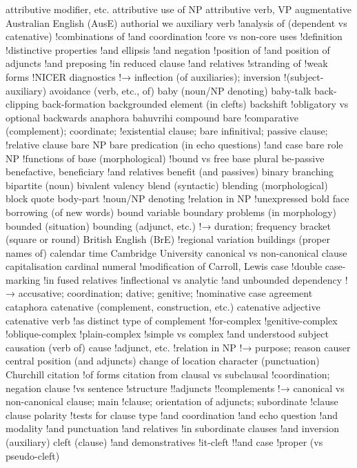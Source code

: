 attributive modifier, etc.
attributive use of NP
attributive verb, VP
augmentative
Australian English (AusE)
authorial we
auxiliary verb
!analysis of (dependent vs catenative)
!combinations of
!and coordination
!core vs non-core uses
!definition
!distinctive properties
!and ellipsis
!and negation
!position of
!and position of adjuncts
!and preposing
!in reduced clause
!and relatives
!stranding of
!weak forms
!NICER diagnostics
!→ inflection (of auxiliaries); inversion
!(subject-auxiliary)
avoidance (verb, etc., of)
baby (noun/NP denoting)
baby-talk
back-clipping
back-formation
backgrounded element (in clefts)
backshift
!obligatory vs optional
backwards anaphora
bahuvrihi compound
bare
!comparative (complement); coordinate;
!existential clause; bare infinitival; passive clause;
!relative clause
bare NP
bare predication (in echo questions)
!and case
bare role NP
!functions of
base (morphological)
!bound vs free
base plural
be-passive
benefactive, beneficiary
!and relatives
benefit (and passives)
binary branching
bipartite (noun)
bivalent valency
blend (syntactic)
blending (morphological)
block quote
body-part
!noun/NP denoting
!relation in NP
!unexpressed
bold face
borrowing (of new words)
bound variable
boundary problems (in morphology)
bounded (situation)
bounding (adjunct, etc.)
!→ duration; frequency
bracket (square or round)
British English (BrE)
!regional variation
buildings (proper names of)
calendar time
Cambridge University
canonical vs non-canonical clause
capitalisation
cardinal numeral
!modification of
Carroll, Lewis
case
!double case-marking
!in fused relatives
!inflectional vs analytic
!and unbounded dependency
!→ accusative; coordination; dative; genitive;
!nominative
case agreement
cataphora
catenative (complement, construction, etc.)
catenative adjective
catenative verb
!as distinct type of complement
!for-complex
!genitive-complex
!oblique-complex
!plain-complex
!simple vs complex
!and understood subject
causation (verb of)
cause
!adjunct, etc.
!relation in NP
!→ purpose; reason
causer
central position (and adjuncts)
change of location
character (punctuation)
Churchill
citation
!of forms
citation from
clausal vs subclausal
!coordination; negation
clause
!vs sentence
!structure
!!adjuncts
!!complements
!→ canonical vs non-canonical clause; main
!clause; orientation of adjuncts; subordinate
!clause
clause polarity
!tests for
clause type
!and coordination
!and echo question
!and modality
!and punctuation
!and relatives
!in subordinate clauses
!and inversion (auxiliary)
cleft (clause)
!and demonstratives
!it-cleft
!!and case
!proper (vs pseudo-cleft)
